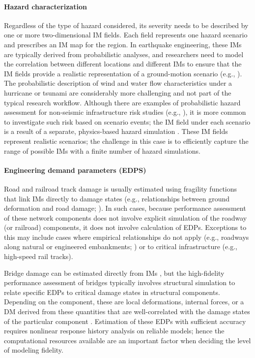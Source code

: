 \paragraph{Hazard characterization} Regardless of the type of hazard considered, its severity needs to be described by one or more two-dimensional IM fields. Each field represents one hazard scenario and prescribes an IM map for the region. In earthquake engineering, these IMs are typically derived from probabilistic analyses, and researchers need to model the correlation between different locations and different IMs to ensure that the IM fields provide a realistic representation of a ground-motion scenario (e.g., \cite{lee2006uncertainty, han2012probabilistic, loth2013spatial}). The probabilistic description of wind and water flow characteristics under a hurricane or tsunami are considerably more challenging and not part of the typical research workflow. Although there are examples of probabilistic hazard assessment for non-seismic infrastructure risk studies (e.g., \cite{kameshwar2014multi}), it is more common to investigate such risk based on scenario events; the IM field under each scenario is a result of a separate, physics-based hazard simulation \citep{bjarnadottir2014regional}. These IM fields represent realistic scenarios; the challenge in this case is to efficiently capture the range of possible IMs with a finite number of hazard simulations. 

\paragraph{Engineering demand parameters (EDPS)} Road and railroad track damage is usually estimated using fragility functions that link IMs directly to damage states (e.g., relationships between ground deformation and road damage; \cite{argyroudis2014fragility}). In such cases, because performance assessment of these network components does not involve explicit simulation of the roadway (or railroad) components, it does not involve calculation of EDPs. Exceptions to this may include cases where empirical relationships do not apply (e.g., roadways along natural or engineered embankments; \cite{lagaros2009computationally, yin2017embankment}) or to critical infrastructure (e.g., high-speed rail tracks).

Bridge damage can be estimated directly from IMs \citep[e.g.,][]{fema2018earthquaketechnical}, but the high-fidelity performance assessment of bridges typically involves structural simulation to relate specific EDPs to critical damage states in structural components. Depending on the component, these are local deformations, internal forces, or a DM derived from these quantities \citep[e.g.,][]{park1985mechanistic} that are well-correlated with the damage states of the particular component \citep{choi2004seismic}. Estimation of these EDPs with sufficient accuracy requires nonlinear response history analysis on reliable models; hence the computational resources available are an important factor when deciding the level of modeling fidelity.

